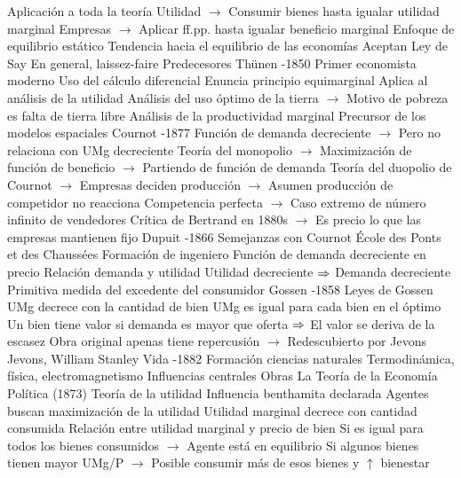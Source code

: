 \documentclass{nuevotema}
\begin{document}
\begin{esquemal}
				\4 Aplicación a toda la teoría
				\4[] Utilidad
				\4[] $\to$ Consumir bienes hasta igualar utilidad marginal
				\4[] Empresas
				\4[] $\to$ Aplicar ff.pp. hasta igualar beneficio marginal
			\3 Enfoque de equilibrio estático
				\4 Tendencia hacia el equilibrio de las economías
				\4 Aceptan Ley de Say
				\4 En general, laissez-faire
		\2 Predecesores
			\3 Thünen
				-1850
				\4 Primer economista moderno
				\4 Uso del cálculo diferencial
				\4 Enuncia principio equimarginal
				\4[] Aplica al análisis de la utilidad
				\4 Análisis del uso óptimo de la tierra
				\4[] $\to$ Motivo de pobreza es falta de tierra libre
				\4 Análisis de la productividad marginal
				\4 Precursor de los modelos espaciales
			\3 Cournot
				-1877
				\4 Función de demanda decreciente
				\4[] $\to$ Pero no relaciona con UMg decreciente
				\4 Teoría del monopolio
				\4[] $\to$ Maximización de función de beneficio
				\4[] $\to$ Partiendo de función de demanda
				\4 Teoría del duopolio de Cournot
				\4[] $\to$ Empresas deciden producción
				\4[] $\to$ Asumen producción de competidor no reacciona
				\4 Competencia perfecta
				\4[] $\to$ Caso extremo de número infinito de vendedores
				\4 Crítica de Bertrand en 1880s
				\4[] $\to$ Es precio lo que las empresas mantienen fijo
			\3 Dupuit
				-1866
				\4 Semejanzas con Cournot
				\4[] École des Ponts et des Chaussées
				\4[] Formación de ingeniero
				\4[] Función de demanda decreciente en precio
				\4 Relación demanda y utilidad
				\4[] Utilidad decreciente $\Rightarrow$ Demanda decreciente
				\4 Primitiva medida del excedente del consumidor
			\3 Gossen
				-1858
				\4 Leyes de Gossen
				\4[i] UMg decrece con la cantidad de bien
				\4[ii] UMg es igual para cada bien en el óptimo
				\4[iii] Un bien tiene valor si demanda es mayor que oferta
				\4[] $\Rightarrow$ El valor se deriva de la escasez
				\4 Obra original apenas tiene repercusión
				\4[] $\to$ Redescubierto por Jevons
		\2 Jevons, William Stanley
			\3 Vida
				-1882
				\4 Formación ciencias naturales
				\4 Termodinámica, física, electromagnetismo
				\4[] Influencias centrales
			\3 Obras
				\4 La Teoría de la Economía Política (1873)
			\3 Teoría de la utilidad
				\4 Influencia benthamita declarada
				\4 Agentes buscan maximización de la utilidad
				\4 Utilidad marginal decrece con cantidad consumida
				\4 Relación entre utilidad marginal y precio de bien
				\4[] Si es igual para todos los bienes consumidos
				\4[] $\to$ Agente está en equilibrio
				\4[] Si algunos bienes tienen mayor UMg/P
				\4[] $\to$ Posible consumir más de esos bienes y $\uparrow$ bienestar

\end{esquemal}
\end{document}
